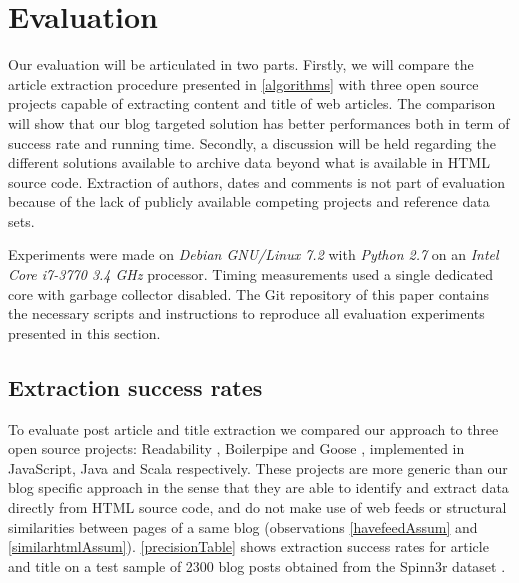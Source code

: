 \section{Evaluation}

Our evaluation will be articulated in two parts. Firstly, we will compare the article extraction procedure presented in \autoref{algorithms} with three open source projects capable of extracting content and title of web articles. The comparison will show that our blog targeted solution has better performances both in term of success rate and running time. Secondly, a discussion will be held regarding the different solutions available to archive data beyond what is available in HTML source code. Extraction of authors, dates and comments is not part of evaluation because of the lack of publicly available competing projects and reference data sets.

Experiments were made on \emph{Debian GNU/Linux 7.2} with \emph{Python 2.7} on an \emph{Intel Core i7-3770 3.4 GHz} processor. Timing measurements used a single dedicated core with garbage collector disabled. The Git repository of this paper \cite{blogforever-crawler-publication}  contains the necessary scripts and instructions to reproduce all evaluation experiments presented in this section.


\subsection{Extraction success rates}
To evaluate post article and title extraction we compared our approach to three open source projects: Readability \cite{python-readability2011}, Boilerpipe \cite{kohlschuetter2010} and Goose \cite{goose2012}, implemented in JavaScript, Java and Scala respectively. These projects are more generic than our blog specific approach in the sense that they are able to identify and extract data directly from HTML source code, and do not make use of web feeds or structural similarities between pages of a same blog (observations \ref{havefeedAssum} and \ref{similarhtmlAssum}). \autoref{precisionTable} shows extraction success rates for article and title on a test sample of 2300 blog posts obtained from the Spinn3r dataset \cite{burton2011}.


